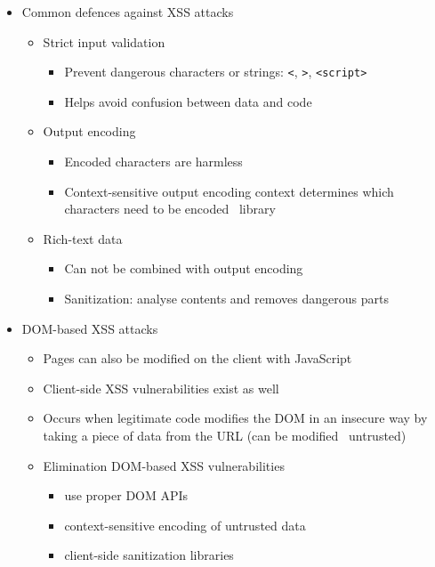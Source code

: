 \documentclass[12pt,titlepage,a4paper]{report}
\begin{document}
\begin{itemize}
				\item Common defences against XSS attacks
				\begin{itemize}
					\item Strict input validation
					\begin{itemize}
						\item Prevent dangerous characters or strings: \texttt{<}, \texttt{>}, \texttt{<script>}
						\item Helps avoid confusion between data and code
					\end{itemize}
					\item Output encoding
					\begin{itemize}
						\item Encoded characters are harmless
						\item Context-sensitive output encoding
							\subitem context determines which characters need to be encoded \textrightarrow \ library
					\end{itemize}
					\item Rich-text data
					\begin{itemize}
						\item Can not be combined with output encoding
						\item Sanitization: analyse contents and removes dangerous parts
					\end{itemize}
				\end{itemize}
			
				\item DOM-based XSS attacks
				\begin{itemize}
					\item Pages can also be modified on the client with JavaScript
					\item Client-side XSS vulnerabilities exist as well
					\item Occurs when legitimate code modifies the DOM in an insecure way
						\subitem by taking a piece of data from the URL (can be modified \textrightarrow \ untrusted)
					\item Elimination DOM-based XSS vulnerabilities
					\begin{itemize}
						\item use proper DOM APIs
						\item context-sensitive encoding of untrusted data
						\item client-side sanitization libraries
					\end{itemize}
				\end{itemize}
			\end{itemize}
\end{document}
